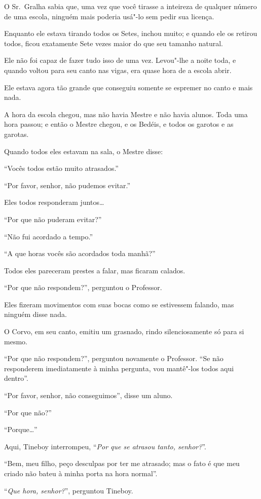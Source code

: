 O Sr.~Gralha sabia que, uma vez que você tirasse a inteireza de qualquer
número de uma escola, ninguém mais poderia usá"-lo sem pedir sua licença.

Enquanto ele estava tirando todos os Setes, inchou muito; e quando ele
os retirou todos, ficou exatamente Sete vezes maior do que seu
tamanho natural.

Ele não foi capaz de fazer tudo isso de uma vez. Levou"-lhe a noite toda,
e quando voltou para seu canto nas vigas, era quase hora de a escola
abrir.

Ele estava agora tão grande que conseguiu somente se espremer no canto e
mais nada.

A hora da escola chegou, mas não havia Mestre e não havia alunos. Toda
uma hora passou; e então o Mestre chegou, e os Bedéis, e todos os
garotos e as garotas.

Quando todos eles estavam na sala, o Mestre disse:

``Vocês todos estão muito atrasados.''

``Por favor, senhor, não pudemos evitar.''

Eles todos responderam juntos…

``Por que não puderam evitar?''

``Não fui acordado a tempo.''

``A que horas vocês são acordados toda manhã?''

Todos eles pareceram prestes a falar, mas ficaram calados.

``Por que não respondem?'', perguntou o Professor.

Eles fizeram movimentos com suas bocas como se estivessem falando, mas ninguém
disse nada.

O Corvo, em seu canto, emitiu um grasnado, rindo silenciosamente só para
si mesmo.

``Por que não respondem?'', perguntou novamente o Professor. ``Se não
responderem imediatamente à minha pergunta, vou mantê"-los todos aqui
dentro''.

``Por favor, senhor, não conseguimos'', disse um aluno.

``Por que não?''

``Porque…''

Aqui, Tineboy interrompeu, ``\emph{Por que se atrasou tanto, senhor?}''.

``Bem, meu filho, peço desculpas por ter me atrasado; mas o fato é que
meu criado não bateu à minha porta na hora normal''.

``\emph{Que hora, senhor?}'', perguntou Tineboy.

